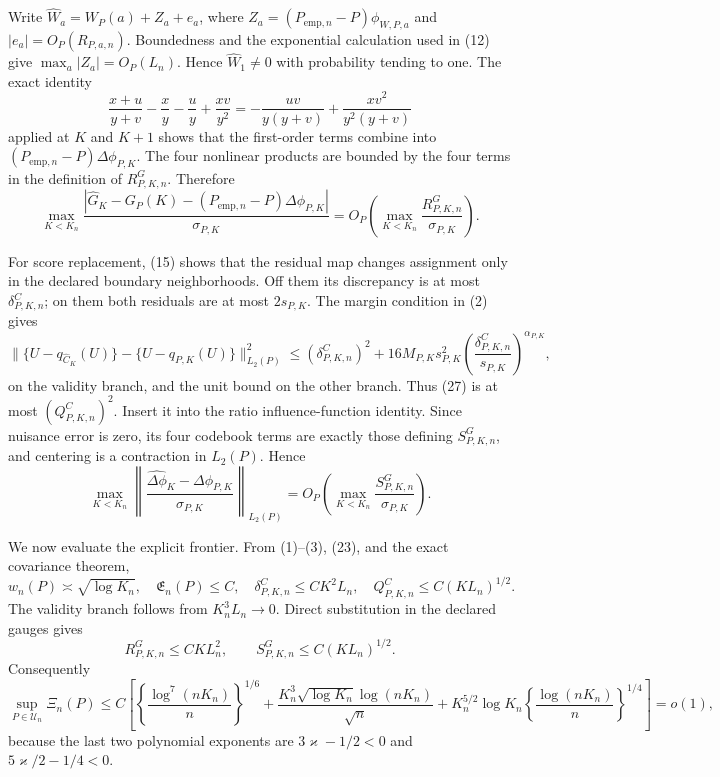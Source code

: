 Write \(\widehat W_a=W_P(a)+Z_a+e_a\), where
\(Z_a=(P_{\mathrm{emp},n}-P)\phi_{W,P,a}\) and
\(|e_a|=O_P(R_{P,a,n})\).  Boundedness and the exponential calculation used in (12) give \(\max_a|Z_a|=O_P(L_n)\).  Hence \(\widehat W_1\neq0\) with probability tending to one.  The exact identity
\[
 \frac{x+u}{y+v}-\frac xy-\frac uy+\frac{xv}{y^2}
 =-\frac{uv}{y(y+v)}+\frac{xv^2}{y^2(y+v)}                                   \tag{25}
\]
applied at \(K\) and \(K+1\) shows that the first-order terms combine into
\((P_{\mathrm{emp},n}-P)\Delta\phi_{P,K}\).  The four nonlinear products are bounded by the four terms in the definition of \(R^G_{P,K,n}\).  Therefore
\[
 \max_{K<K_n}\frac{|\widehat G_K-G_P(K)
 -(P_{\mathrm{emp},n}-P)\Delta\phi_{P,K}|}{\sigma_{P,K}}
 =O_P\!\left(\max_{K<K_n}\frac{R^G_{P,K,n}}{\sigma_{P,K}}\right).              \tag{26}
\]

For score replacement, (15) shows that the residual map changes assignment only in the declared boundary neighborhoods.  Off them its discrepancy is at most \(\delta^C_{P,K,n}\); on them both residuals are at most \(2s_{P,K}\).  The margin condition in (2) gives
\[
 \|\{U-q_{\widehat C_K}(U)\}-\{U-q_{P,K}(U)\}\|_{L_2(P)}^2
 \leq(\delta^C_{P,K,n})^2
 +16M_{P,K}s_{P,K}^2
 \left(\frac{\delta^C_{P,K,n}}{s_{P,K}}\right)^{\alpha_{P,K}},                 \tag{27}
\]
on the validity branch, and the unit bound on the other branch.  Thus (27) is at most \((Q^C_{P,K,n})^2\).  Insert it into the ratio influence-function identity.  Since nuisance error is zero, its four codebook terms are exactly those defining \(S^G_{P,K,n}\), and centering is a contraction in \(L_2(P)\).  Hence
\[
 \max_{K<K_n}\left\|
 \frac{\widehat{\Delta\phi}_{K}-\Delta\phi_{P,K}}{\sigma_{P,K}}
 \right\|_{L_2(P)}
 =O_P\!\left(\max_{K<K_n}\frac{S^G_{P,K,n}}{\sigma_{P,K}}\right).              \tag{28}
\]

We now evaluate the explicit frontier.  From (1)--(3), (23), and the exact covariance theorem,
\[
 w_n(P)\asymp\sqrt{\log K_n},\quad \mathfrak E_n(P)\leq C,\quad
 \delta^C_{P,K,n}\leq CK^2L_n,\quad
 Q^C_{P,K,n}\leq C(KL_n)^{1/2}.                                                \tag{29}
\]
The validity branch follows from \(K_n^3L_n\to0\).  Direct substitution in the declared gauges gives
\[
 R^G_{P,K,n}\leq CKL_n^2,\qquad
 S^G_{P,K,n}\leq C(KL_n)^{1/2}.                                                \tag{30}
\]
Consequently
\[
\sup_{P\in\mathcal U_n}\Xi_n(P)
\leq C\left[
\left\{\frac{\log^7(nK_n)}n\right\}^{1/6}
+\frac{K_n^3\sqrt{\log K_n}\log(nK_n)}{\sqrt n}
+K_n^{5/2}\log K_n\left\{\frac{\log(nK_n)}n\right\}^{1/4}\right]=o(1),          \tag{31}
\]
because the last two polynomial exponents are \(3\varkappa-1/2<0\) and
\(5\varkappa/2-1/4<0\).

